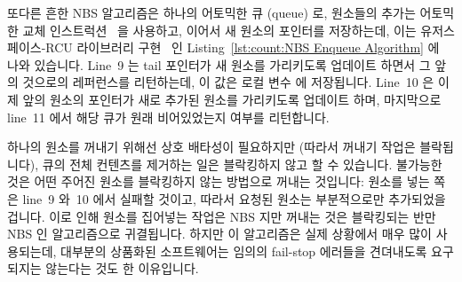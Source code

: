 또다른 흔한 NBS 알고리즘은 하나의 어토믹한 큐 (queue) 로, 원소들의 추가는
어토믹한 교체 인스트럭션~\cite{MagedMichael1993JPDC} 을 사용하고, 이어서 새
원소의  포인터를 저장하는데, 이는 유저스페이스-RCU 라이브러리
구현~\cite{MathieuDesnoyers2009URCU} 인
Listing~\ref{lst:count:NBS Enqueue Algorithm} 에 나와 있습니다.
Line~9 는 tail 포인터가 새 원소를 가리키도록 업데이트 하면서 그 앞의 것으로의
레퍼런스를 리턴하는데, 이 값은 로컬 변수  에 저장됩니다.
Line~10 은 이제 앞의 원소의  포인터가 새로 추가된 원소를 가리키도록
업데이트 하며, 마지막으로 line~11 에서 해당 큐가 원래 비어있었는지 여부를
리턴합니다.
\iffalse

Another common NBS algorithm is the atomic queue where elements are
enqueued using an atomic exchange instruction~\cite{MagedMichael1993JPDC},
followed by a store into the \co{->next} pointer of the new element's
predecessor, as shown in
Listing~\ref{lst:count:NBS Enqueue Algorithm},
which shows the userspace-RCU library
implementation~\cite{MathieuDesnoyers2009URCU}.
Line~9 updates the tail pointer to reference the new element while
returning a reference to its predecessor, which is stored in
local variable \co{old_tail}.
Line~10 then updates the predecessor's \co{->next} pointer to
reference the newly added element, and finally line~11
returns an indication as to whether or not the queue was initially
empty.
\fi

하나의 원소를 꺼내기 위해선 상호 배타성이 필요하지만 (따라서 꺼내기 작업은
블락됩니다), 큐의 전체 컨텐츠를 제거하는 일은 블락킹하지 않고 할 수 있습니다.
불가능한 것은 어떤 주어진 원소를 블락킹하지 않는 방법으로 꺼내는 것입니다:
원소를 넣는 쪽은 line~9 와~10 에서 실패할 것이고, 따라서 요청된 원소는
부분적으로만 추가되었을 겁니다.
이로 인해 원소를 집어넣는 작업은 NBS 지만 꺼내는 것은 블락킹되는 반만 NBS 인
알고리즘으로 귀결됩니다.
하지만 이 알고리즘은 실제 상황에서 매우 많이 사용되는데, 대부분의 상품화된
소프트웨어는 임의의 fail-stop 에러들을 견뎌내도록 요구되지는 않는다는 것도 한
이유입니다.
\iffalse

Although mutual exclusion is required to dequeue a single element
(so that dequeue is blocking), it is possible to carry out a non-blocking
removal of the entire contents of the queue.
What is not possible is to dequeue any given element in a non-blocking
manner: The enqueuer might have failed between lines~9 and~10 of the
listing, so that the element in question is only partially enqueued.
This results in a half-NBS algorithm where enqueues are NBS but
dequeues are blocking.
This algorithm is nevertheless heavily used in practice, in part because
most production software is not required to tolerate arbitrary fail-stop
errors.
\fi

